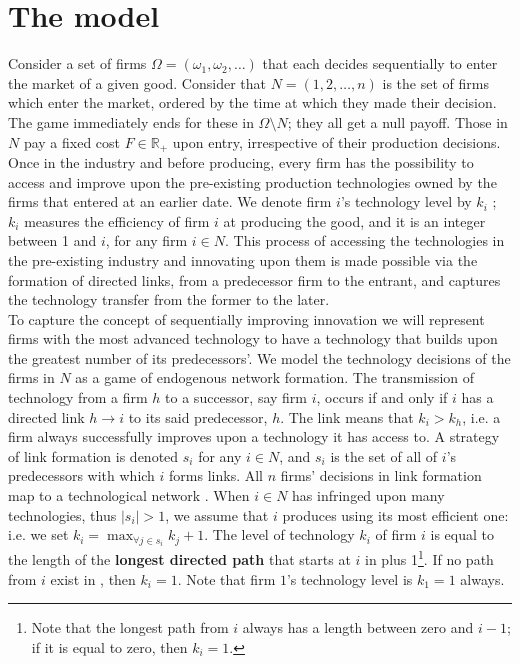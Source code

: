 \documentclass{article}
\begin{document}
\section{The model}
\indent Consider a set of firms $\Omega=(\omega_1,\omega_2,\ldots)$ that each decides sequentially to enter the market of a given good. Consider that $N=(1,2,\ldots,n)$ is the set of firms which enter the market, ordered by the time at which they made their decision. The game immediately ends for these in $\Omega\setminus N$; they all get a null payoff. Those in $N$ pay a fixed cost $F\in \mathbb{R}_+$ upon entry, irrespective of their production decisions. Once in the industry and before producing, every firm has the possibility to access and improve upon the pre-existing production technologies owned by the firms that entered at an earlier date. We denote firm $i$'s technology level by $k_i$ ; $k_i$ measures the efficiency of firm $i$ at producing the good, and it is an integer between 1 and $i$, for any firm $i\in N$. This process of accessing the technologies in the pre-existing industry and innovating upon them is made possible via the formation of directed links, from a predecessor firm to the entrant, and captures the technology transfer from the former to the later. \\
\indent To capture the concept of sequentially improving innovation we will represent firms with the most advanced technology to have a technology that builds upon the greatest number of its predecessors'. We model the technology decisions of the firms in $N$ as a game of endogenous network formation. The transmission of technology from a firm $h$ to a successor, say firm $i$, occurs if and only if $i$ has a directed link $h\rightarrow i$ to its said predecessor, $h$. The link means that $k_i>k_h$, i.e. a firm always successfully improves upon a technology it has access to. A strategy of link formation is denoted $s_i$ for any $i\in N$, and $s_i$ is the set of all of $i$'s predecessors with which $i$ forms links. All $n$ firms' decisions in link formation map to a technological network . When $i\in N$ has infringed upon many technologies, thus $|s_i|>1$, we assume that $i$ produces using its most efficient one: i.e. we set $k_i=\max_{\forall j\in s_i} k_j+1$. The level of technology $k_i$ of firm $i$ is equal to the length of the \textbf{longest directed path} that starts at $i$ in  plus 1\footnote{Note that the longest path from $i$ always has a length between zero and $i-1$; if it is equal to zero, then $k_i=1$.}. If no path from $i$ exist in , then $k_i=1$. Note that firm $1$'s technology level is $k_1=1$ always. \\
\end{document}
